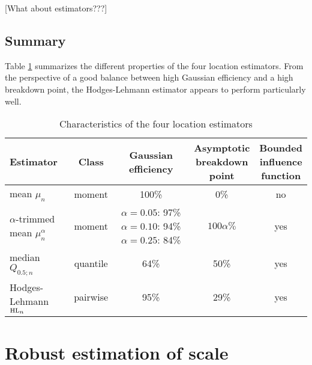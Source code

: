 \alert{[What about  estimators???]}

\subsection{Summary}


Table \ref{tab:stat:location} summarizes the different properties of the four
location estimators. From the perspective of a good balance between high
Gaussian efficiency and a high breakdown point, the Hodges-Lehmann estimator
appears to perform particularly well.

\begin{table}[h!]
    \centering
    \caption{Characteristics of the four location estimators}
    \label{tab:stat:location}
    \begin{tabular}{lcccc}
        \toprule
        Estimator
        & Class  
        & \subtab{c}{Gaussian\\ efficiency}
        & \subtab{c}{Asymptotic\\ breakdown\\ point} 
        & \subtab{c}{Bounded\\ influence\\ function}
        \\\midrule
        mean $\mu_n$                            & moment   & 100\% &  0\%          & no
        \\\addlinespace
        $\alpha$-trimmed mean $\mu_n^{\alpha}$  & moment   & 
            \subtab{l}{$\alpha=0.05$: 97\%\\ $\alpha=0.10$: 94\%\\ $\alpha=0.25$: 84\%} 
                                                                   & $100\alpha\%$ & yes
        \\\addlinespace
        median $Q_{0.5;n}$                      & quantile & 64\%  & 50\%          & yes
        \\\addlinespace
        Hodges-Lehmann $\stsc{HL}_n$            & pairwise & 95\%  & 29\%          & yes
        \\\bottomrule
    \end{tabular}
\end{table}


\section{Robust estimation of scale\label{subsec:scale}}


